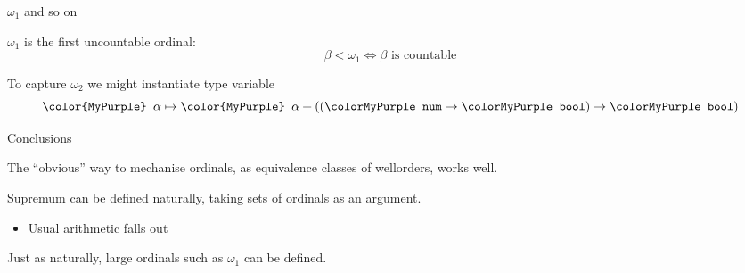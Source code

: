 \documentclass[xetex,14pt]{beamer}
\newcommand{\ty}[1]{\texttt{\color{MyPurple} #1}}
\begin{document}
\begin{frame}{$\omega_1$ and so on}

$\omega_1$ is the first uncountable ordinal:
\[
\beta < \omega_1 \iff \beta \mbox{ is countable}
\]

\bigskip
To capture $\omega_2$ we might instantiate type variable
\[
\ty{$\alpha$} \mapsto \ty{$\alpha + ((\num\to\bool)\to\bool)$}
\]

\end{frame}

\begin{frame}{Conclusions}

The “obvious” way to mechanise ordinals, as equivalence classes of wellorders, works well.

\bigskip
Supremum can be defined naturally, taking sets of ordinals as an argument.
\begin{itemize}
\item Usual arithmetic falls out
\end{itemize}

\bigskip
Just as naturally, large ordinals such as $\omega_1$ can be defined.

\end{frame}
\end{document}
